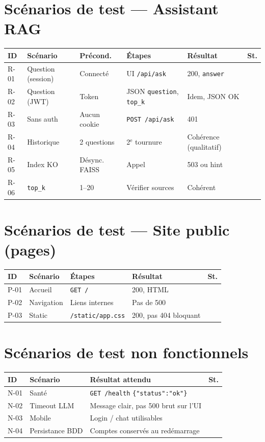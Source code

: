 \documentclass[11pt,a4paper]{article}
\begin{document}
\section{Scénarios de test — Assistant RAG}
\small
\begin{longtable}{@{}p{0.6cm}p{1.8cm}p{1.3cm}p{2.2cm}p{3.0cm}p{0.7cm}@{}}
\toprule
\textbf{ID} & \textbf{Scénario} & \textbf{Précond.} & \textbf{Étapes} & \textbf{Résultat} & \textbf{St.} \\
\midrule
R-01 & Question (session) & Connecté & UI \texttt{/api/ask} & 200, \texttt{answer} & \\
R-02 & Question (JWT) & Token & JSON \texttt{question}, \texttt{top\_k} & Idem, JSON OK & \\
R-03 & Sans auth & Aucun cookie & \texttt{POST /api/ask} & 401 & \\
R-04 & Historique & 2 questions & 2$^{\mathrm{e}}$ tournure & Cohérence (qualitatif) & \\
R-05 & Index KO & Désync. FAISS & Appel & 503 ou hint & \\
R-06 & \texttt{top\_k} & 1--20 & Vérifier sources & Cohérent & \\
\bottomrule
\end{longtable}
\normalsize

\section{Scénarios de test — Site public (pages)}
\small
\begin{longtable}{@{}p{0.6cm}p{2.2cm}p{2.4cm}p{3.6cm}p{0.7cm}@{}}
\toprule
\textbf{ID} & \textbf{Scénario} & \textbf{Étapes} & \textbf{Résultat} & \textbf{St.} \\
\midrule
P-01 & Accueil & \texttt{GET /} & 200, HTML & \\
P-02 & Navigation & Liens internes & Pas de 500 & \\
P-03 & Static & \texttt{/static/app.css} & 200, pas 404 bloquant & \\
\bottomrule
\end{longtable}
\normalsize

\section{Scénarios de test non fonctionnels}
\small
\begin{longtable}{@{}p{0.6cm}p{2.2cm}p{6.8cm}p{0.7cm}@{}}
\toprule
\textbf{ID} & \textbf{Scénario} & \textbf{Résultat attendu} & \textbf{St.} \\
\midrule
N-01 & Santé & \texttt{GET /health} \texttt{\{"status":"ok"\}} & \\
N-02 & Timeout LLM & Message clair, pas 500 brut sur l'UI & \\
N-03 & Mobile & Login / chat utilisables & \\
N-04 & Persistance BDD & Comptes conservés au redémarrage & \\
\bottomrule
\end{longtable}
\normalsize
\end{document}

